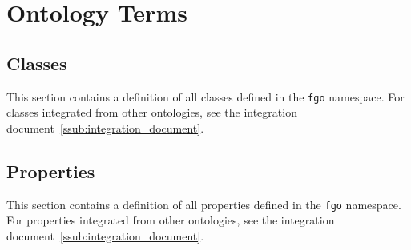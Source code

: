 \documentclass[twoside]{fast_latex}
\begin{document}


% 


\clearpage
{}
\section{Ontology Terms}
\label{sec:ontology_terms}
\subsection{Classes} %
\label{sub:classes}

This section contains a definition of all classes defined in the \texttt{fgo} namespace. For classes integrated from other ontologies, see the integration document~\ref{ssub:integration_document}.

\singlespacing
\begin{small}

\end{small}
\doublespacing


\subsection{Properties} %
\label{sub:properties}

This section contains a definition of all properties defined in the \texttt{fgo} namespace. For properties integrated from other ontologies, see the integration document~\ref{ssub:integration_document}.

\singlespacing
\begin{small}

\end{small}
\doublespacing



\clearpage
{}
\end{document}
